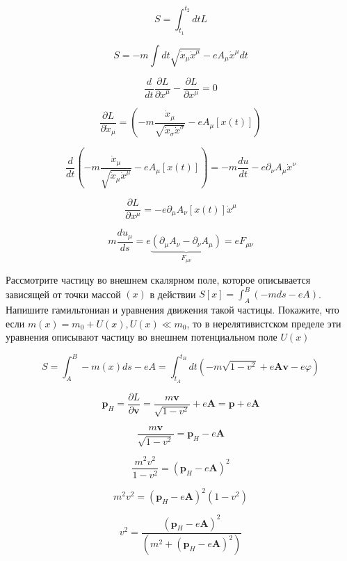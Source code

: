\begin{solution}
	$$
	S = \int_{t_1}^{t_2}dt  L 
	$$
	
	
	$$
	S = -m \int d t \sqrt{\dot{x}_{\mu} \dot{x}^{\mu}} - e A_{\mu} \dot{x}^{\mu} dt
	$$
	

	$$
	\frac{d}{d t}\frac{\partial L}{\partial \dot{x}^{\mu}} - \frac{\partial L }{\partial x^{\mu}} = 0 
	$$

	$$
	\frac{\partial L}{\partial \dot{x}_{\mu}}= \left(-m \frac{\dot{x}_{\mu}}{\sqrt{\dot{x}_{\sigma} \dot{x}^{\sigma}}} - e A_{\mu}\left[x(t)\right]\right)
	$$

	
	$$
	\frac{d}{d t}\left(-m \frac{\dot{x}_{\mu}}{\sqrt{\dot{x}_{\mu} \dot{x}^{\mu}}} - e A_{\mu}\left[x(t)\right]\right) = -m \frac{d u}{d t} - e \partial_{\nu} A_{\mu}\dot{x}^{\nu}
	$$
	
	$$
	\frac{\partial L }{\partial x^{\mu}} = - e \partial_{\mu} A_{\nu}  \left[x(t)\right] \dot{x}^{\mu}
	$$
	
	$$
	m\frac{d u_{\mu}}{d s} = e \underbrace{\left(\partial_{\mu}A_{\nu} - \partial_{\nu}A_{\mu}\right)}_{F_{\mu \nu}} = e F_{\mu \nu}
	$$
	
	\begin{problem}
		Рассмотрите частицу во внешнем скалярном поле, которое описывается зависящей от точки
		массой $(x)$ в действии $S\left[x\right] = \int^{B}_{A} \left(- m ds -e A\right)$. Напишите гамильтониан и уравнения движения такой частицы. Покажите, что если $m(x) = m_0+U(x), U(x)\ll m_{0}$, то в нерелятивистском пределе эти уравнения описывают
		частицу во внешнем потенциальном поле $U(x)$
	\end{problem}
	
	\begin{solution}
	$$
	S = \int^{B}_{A} -m(x)ds -e A = \int^{t_B}_{t_A} dt \left(- m \sqrt{1 - v^2} + e\boldsymbol{A}\boldsymbol{v} - e \varphi \right)
	$$
	
	$$
	\boldsymbol{p}_{H} = \frac{\partial L}{\partial \boldsymbol{v}} = \frac{m \boldsymbol{v}}{\sqrt{1-v^2}} + e \boldsymbol{A} = \boldsymbol{p} + e\boldsymbol{A}
	$$
	
	$$
	\frac{m \boldsymbol{v}}{\sqrt{1-v^2}}= \boldsymbol{p}_H-e\boldsymbol{A}
	$$
	
	$$
	\frac{m^2 v^2}{1-v^2}= \left(\boldsymbol{p}_H-e\boldsymbol{A}\right)^2
	$$
	
	$$
	m^2 v^2 =  \left(\boldsymbol{p}_H-e\boldsymbol{A}\right)^2 \left(1-v^2\right)
	$$
	
	$$
	v^2 = \frac{\left(\boldsymbol{p}_H-e\boldsymbol{A}\right)^2 }{\left(m^2 + \left(\boldsymbol{p}_H-e\boldsymbol{A}\right)^2\right)}
	$$
	

\end{solution}
\end{solution}
